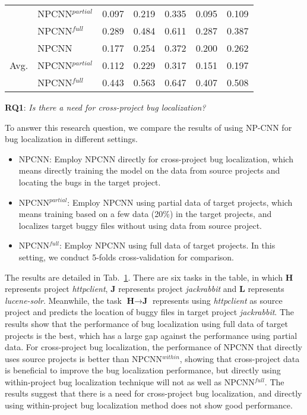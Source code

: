 \begin{table}[htbp]
{\begin{tabular}{c|l|c|c|c|c|c}
          & NPCNN$^{partial}$ & 0.097  & 0.219  & 0.335  & 0.095  & 0.109  \\
          & NPCNN$^{full}$ & 0.289  & 0.484  & 0.611  & 0.287  & 0.387  \\
          \midrule
    \multirow{3}[0]{*}{Avg.} & NPCNN & 0.177  & 0.254  & 0.372  & 0.200  & 0.262  \\
          & NPCNN$^{partial}$ & 0.112  & 0.229  & 0.317  & 0.151  & 0.197  \\
          & NPCNN$^{full}$ & 0.443  & 0.563  & 0.647  & 0.407  & 0.508  \\
          \bottomrule
    \end{tabular}%
    }

  \label{tab:within}%
\end{table}%



\textbf{RQ1}: \textit{Is there a need for cross-project bug localization?}

To answer this research question, we compare the results of using NP-CNN for bug localization in different settings.

\begin{itemize}
  \item NPCNN: Employ NPCNN directly for cross-project bug localization, which means directly training the model on the data from source projects and locating the bugs in the target project.
  \item NPCNN$^{partial}$: Employ NPCNN using partial data of target projects, which means training based on a few data (20\%) in the target projects, and localizes target buggy files without using data from source project.
  \item NPCNN$^{full}$: Employ NPCNN using full data of target projects. In this setting, we conduct 5-folds cross-validation for comparison.
\end{itemize}

The results are detailed in Tab.~\ref{tab:within}. There are six tasks in the table, in which $\textbf{H}$ represents project \textit{httpclient}, $\textbf{J}$ represents project \textit{jackrabbit} and $\textbf{L}$ represents \textit{lucene-solr}. Meanwhile, the task $\textbf{H} \rightarrow \textbf{J}$ represents using \textit{httpclient} as source project and predicts the location of buggy files in target project \textit{jackrabbit}. The results show that the performance of bug localization using full data of target projects is the best, which has a large gap against the performance using partial data. For cross-project bug localization, the performance of NPCNN that directly uses source projects is better than NPCNN$^{within}$, showing that cross-project data is beneficial to improve the bug localization performance, but directly using within-project bug localization technique will not as well as NPCNN$^{full}$. The results suggest that there is a need for cross-project bug localization, and directly using within-project bug localization method does not show good performance.

